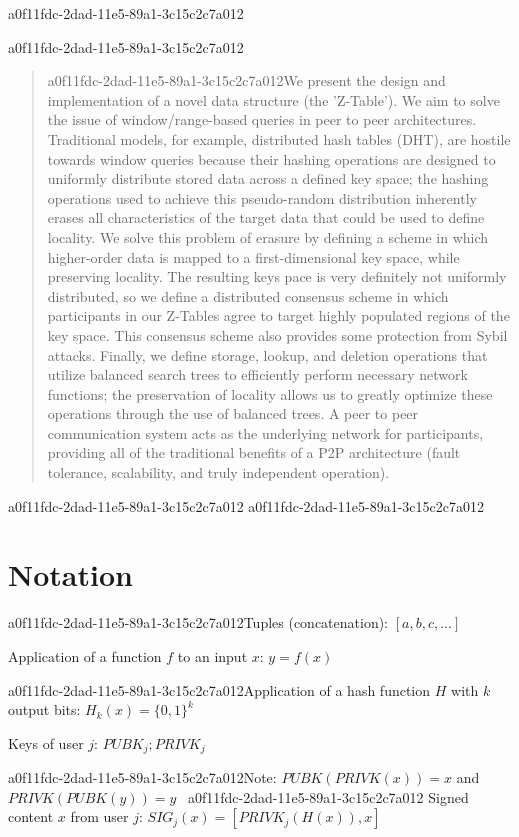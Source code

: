 \documentclass[12pt]{article}
\begin{document}
a0f11fdc-2dad-11e5-89a1-3c15c2c7a012
\maketitle
a0f11fdc-2dad-11e5-89a1-3c15c2c7a012
\begin{abstract}
a0f11fdc-2dad-11e5-89a1-3c15c2c7a012We present the design and implementation of a novel data structure (the 'Z-Table'). We aim to solve the issue of window/range-based queries in peer to peer architectures. Traditional models, for example,  distributed hash tables (DHT), are hostile towards window queries because their hashing operations are designed to uniformly distribute stored data across a defined key space; the hashing operations used to achieve this pseudo-random distribution inherently erases all characteristics of the target data that could be used to define locality. We solve this problem of erasure by defining a scheme in which higher-order data is mapped to a first-dimensional key space, while preserving locality. The resulting keys pace is very definitely not uniformly distributed, so we define a distributed consensus scheme in which participants in our Z-Tables agree to target highly populated regions of the key space. This consensus scheme also provides some protection from Sybil attacks. Finally, we define storage, lookup, and deletion operations that utilize balanced search trees to efficiently perform necessary network functions; the preservation of locality allows us to greatly optimize these operations through the use of balanced trees. A peer to peer communication system acts as the underlying network for participants, providing all of the traditional benefits of a P2P architecture (fault tolerance, scalability, and truly independent operation).
\end{abstract}
a0f11fdc-2dad-11e5-89a1-3c15c2c7a012
a0f11fdc-2dad-11e5-89a1-3c15c2c7a012\section{Notation}

a0f11fdc-2dad-11e5-89a1-3c15c2c7a012Tuples (concatenation): $[a,b,c,...]$

Application of a function $f$ to an input $x$: $y=f(x)$

a0f11fdc-2dad-11e5-89a1-3c15c2c7a012Application of a hash function $H$ with $k$ output bits: $H_{k}(x) = \{0,1\}^k$

Keys of user $j$: $ PUBK_j; PRIVK_j $

a0f11fdc-2dad-11e5-89a1-3c15c2c7a012Note: $PUBK(PRIVK(x)) = x$ and $PRIVK(PUBK(y)) = y$~
a0f11fdc-2dad-11e5-89a1-3c15c2c7a012
Signed content $x$ from user $j$: $SIG_j(x) = \left[ PRIVK_j( H(x) ), x \right]$
\end{document}
